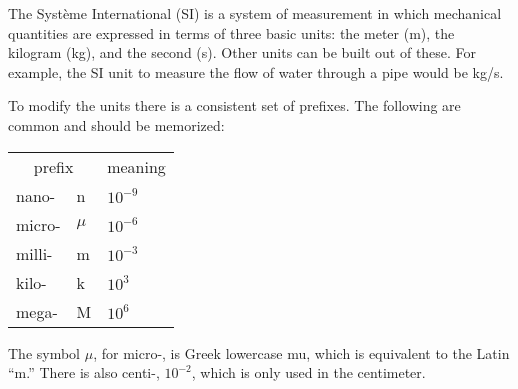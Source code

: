 The Syst\`eme International (SI) is a system of measurement in which
mechanical quantities are expressed in terms of three basic units:
the meter (m), the kilogram (kg), and the second (s).
Other units can be built out of these. For example, the SI
unit to measure the flow of water through a pipe would be kg/s.

To modify the units there is a consistent set of prefixes.
The following are common and
should be memorized:

\begin{center}
\begin{tabular}{lll}
    \multicolumn{2}{c}{prefix} & meaning \\
    nano-   &   n     &$10^{-9}$ \\
    micro-  &  $\mu$  &$10^{-6}$ \\
    milli- &   m   & $10^{-3}$ \\
    kilo-  &   k   & $10^3$ \\
    mega-   &  M      &$10^6$ 
\end{tabular}
\end{center}

\noindent The symbol $\mu$, for micro-, is Greek lowercase mu, which is equivalent
to the Latin ``m.'' There is also centi-, $10^{-2}$, which is only used in the
centimeter.

